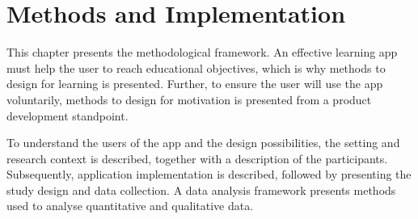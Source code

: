 \chapter{Methods and Implementation}\label{cha:Method}





This chapter presents the methodological framework. An effective learning app must help the user to reach educational objectives, which is why methods to design for learning is presented. Further, to ensure the user will use the app voluntarily, methods to design for motivation is presented from a product development standpoint.

To understand the users of the app and the design possibilities, the setting and research context is described, together with a description of the participants. Subsequently, application implementation is described, followed by presenting the study design and data collection. A data analysis framework presents methods used to analyse quantitative and qualitative data.












